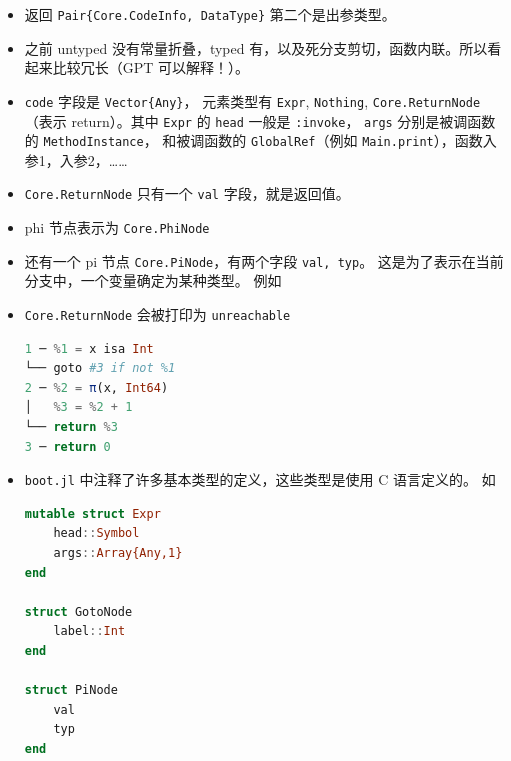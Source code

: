 \begin{itemize}
\item 返回 \verb`Pair{Core.CodeInfo, DataType}` 第二个是出参类型。
\item 之前 untyped 没有常量折叠，typed 有，以及死分支剪切，函数内联。所以看起来比较冗长（GPT 可以解释！）。
\item \verb`code` 字段是 \verb`Vector{Any}`， 元素类型有 \verb`Expr`, \verb`Nothing`, \verb`Core.ReturnNode`（表示 return）。其中 \verb`Expr` 的 \verb`head` 一般是 \verb`:invoke`， \verb`args` 分别是被调函数的 \verb`MethodInstance`， 和被调函数的 \verb`GlobalRef`（例如 \verb`Main.print`），函数入参1，入参2，……
\item \verb`Core.ReturnNode` 只有一个 \verb`val` 字段，就是返回值。
\item phi 节点表示为 \verb`Core.PhiNode`
\item 还有一个 pi 节点 \verb`Core.PiNode`，有两个字段 \verb`val, typ`。 这是为了表示在当前分支中，一个变量确定为某种类型。 例如
\item \verb`Core.ReturnNode` 会被打印为 \verb`unreachable`
\begin{lstlisting}[language=julia]
1 ─ %1 = x isa Int
└── goto #3 if not %1
2 ─ %2 = π(x, Int64)
│   %3 = %2 + 1
└── return %3
3 ─ return 0
\end{lstlisting}
\item \verb`boot.jl` 中注释了许多基本类型的定义，这些类型是使用 C 语言定义的。 如
\begin{lstlisting}[language=julia]
mutable struct Expr
    head::Symbol
    args::Array{Any,1}
end

struct GotoNode
    label::Int
end

struct PiNode
    val
    typ
end


\end{lstlisting}
\end{itemize}
